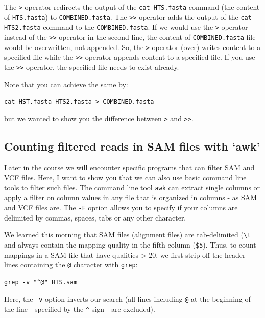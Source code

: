 \documentclass[11pt]{article}
\begin{document}
The \texttt{>} operator redirects the output of the \texttt{cat HTS.fasta}
command (the content of \texttt{HTS.fasta}) to \texttt{COMBINED.fasta}. The
\texttt{>>} operator adds the output of the \texttt{cat HTS2.fasta} command to
the \texttt{COMBINED.fasta}. If we would use the \texttt{>} operator instead of
the \texttt{>>} operator in the second line, the content of
\texttt{COMBINED.fasta} file would be overwritten, not appended. So, the \texttt{>}
operator (over) writes content to a specified file while the \texttt{>>}
operator appends content to a specified file. If you use the \texttt{>>}
operator, the specified file needs to exist already.

Note that you can achieve the same by:


\begin{verbatim}
cat HST.fasta HTS2.fasta > COMBINED.fasta
\end{verbatim}

but we wanted to show you the difference between \texttt{>} and \texttt{>>}.
\subsection{Counting filtered reads in SAM files with `awk'}
\label{sec-4-5}

Later in the course we will encounter specific programs that can filter
SAM and VCF files. Here, I want to show you that we can also use basic
command line tools to filter such files.  The command line tool \texttt{awk}
can extract single columns or apply a filter on column values in
any file that is organized in columns - as SAM and VCF files
are. The \texttt{-F} option allows you to specify if your columns are
delimited by commas, spaces, tabs or any other character.

We learned this morning that SAM files (alignment files) are
 tab-delimited (\texttt{\textbackslash{}t} and always contain the mapping quality in the
 fifth column (\texttt{\$5}). Thus, to count mappings in a SAM file that
 have qualities > 20, we first strip off the header lines
 containing the \texttt{@} character  with \texttt{grep}:


\begin{verbatim}
grep -v "^@" HTS.sam
\end{verbatim}

Here, the \texttt{-v} option inverts our search (all lines including \texttt{@} at
the beginning of the line - specified by the \texttt{\textasciicircum{}} sign - are excluded).
\end{document}

